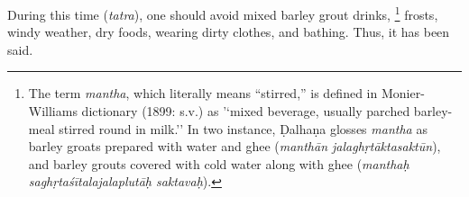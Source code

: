 \begin{translation}
%
%

\item[38] %
During this time (\emph{tatra}), one should avoid mixed barley grout drinks,%
	\footnote{The term \emph{mantha}, which literally means ``stirred,'' is defined in Monier-Williams dictionary (1899: s.v.) as '`mixed beverage, usually parched barley-meal stirred round in milk.'' In two instance, Ḍalhaṇa \citep[811 and 779]{vulgate} glosses \emph{mantha} as barley groats prepared with water and ghee (\emph{manthān jalaghṛtāktasaktūn}), and barley grouts covered with cold water along with ghee (\emph{manthaḥ saghṛtaśītalajalaplutāḥ saktavaḥ}).} %
%
frosts, windy weather, dry foods, wearing dirty clothes, and bathing. %
%
Thus, it has been said.


\end{translation}
